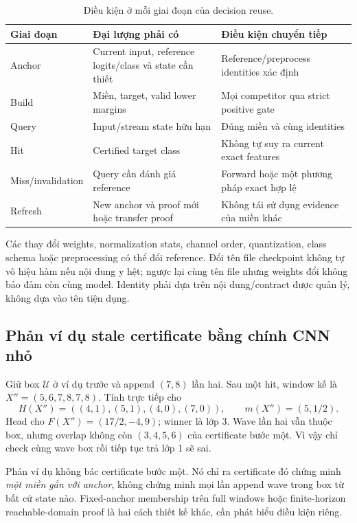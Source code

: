 \documentclass[11pt,a4paper]{article}
\newcommand{\Uset}{\mathcal U}
\theoremstyle{definition}
\begin{document}
\begin{table}[!htbp]\centering\small
\caption{Điều kiện ở mỗi giai đoạn của decision reuse.}
\begin{tabularx}{\linewidth}{@{}P{3cm}YY@{}}\toprule
Giai đoạn & Đại lượng phải có & Điều kiện chuyển tiếp\\\midrule
Anchor & Current input, reference logits/class và state cần thiết & Reference/preprocess identities xác định\\
Build & Miền, target, valid lower margins & Mọi competitor qua strict positive gate\\
Query & Input/stream state hữu hạn & Đúng miền và cùng identities\\
Hit & Certified target class & Không tự suy ra current exact features\\
Miss/invalidation & Query cần đánh giá reference & Forward hoặc một phương pháp exact hợp lệ\\
Refresh & New anchor và proof mới hoặc transfer proof & Không tái sử dụng evidence của miền khác\\\bottomrule
\end{tabularx}
\end{table}
Các thay đổi weights, normalization stats, channel order, quantization,
class schema hoặc preprocessing có thể đổi reference. Đổi tên file
checkpoint không tự vô hiệu hàm nếu nội dung y hệt; ngược lại cùng tên
file nhưng weights đổi không bảo đảm còn cùng model. Identity phải dựa
trên nội dung/contract được quản lý, không dựa vào tên tiện dụng.

\subsection{Phản ví dụ stale certificate bằng chính CNN nhỏ}
Giữ box $\Uset$ ở ví dụ trước và append $(7,8)$ lần hai. Sau một hit,
window kế là $X''=(5,6,7,8,7,8)$. Tính trực tiếp cho
\begin{equation}
H(X'')=((4,1),(5,1),(4,0),(7,0)),\qquad m(X'')=(5,1/2).
\end{equation}
Head cho $F(X'')=(17/2,-4,9)$; winner là lớp 3. Wave lần hai vẫn thuộc
box, nhưng overlap không còn $(3,4,5,6)$ của certificate bước một.
Vì vậy chỉ check cùng wave box rồi tiếp tục trả lớp 1 sẽ sai.

Phản ví dụ không bác certificate bước một. Nó chỉ ra certificate đó
chứng minh \emph{một miền gắn với anchor}, không chứng minh mọi lần
append wave trong box từ bất cứ state nào. Fixed-anchor membership
trên full windows hoặc finite-horizon reachable-domain proof là hai
cách thiết kế khác, cần phát biểu điều kiện riêng.
\end{document}
